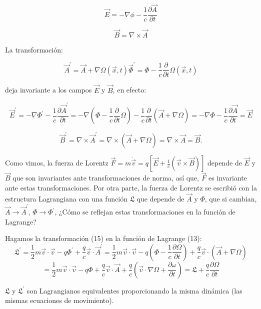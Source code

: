 \documentclass{article}
\begin{document}
\begin{equation*}
\vec{E} = -\nabla \phi - \frac{1}{c} \frac{\partial \vec{A}}{\partial t}
\end{equation*}

\begin{equation*}
\vec{B} = \nabla \times \vec{A}
\end{equation*}

La transformación:

\begin{equation}
\vec{A}^{'} = \vec{A} + \nabla \Omega (\vec{x},t)
\vec{\Phi}^{'} = \Phi - \frac{1}{c} \frac{\partial }{\partial t} \Omega(\vec{x},t)
\end{equation}

deja invariante a los campos $\vec{E}$ y $\vec{B}$, en efecto: 

\begin{equation*}
\vec{E}^{'} = -\nabla \Phi^{'} - \frac{1}{c} \frac{\partial \vec{A}^{'}}{\partial t} = - \nabla \left ( \Phi - \frac{1}{c} \frac{\partial }{\partial t} \Omega \right ) - \frac{1}{c} \frac{\partial }{\partial t} \left (  \vec{A} + \nabla \Omega \right ) = -\nabla\Phi - \frac{1}{c} \frac{\partial \vec{A}}{\partial t} = \vec{E}
\end{equation*}

\begin{equation*}
\vec{B}^{'} = \nabla \times \vec{A}^{'} = \nabla \times \left ( \vec{A} + \nabla \Omega \right ) = \nabla \times \vec{A} = \vec{B}.
\end{equation*}

Como vimos, la fuerza de Lorentz $\vec{F} = m\dot \vec{v} = q\left [ \vec{E} + \frac{1}{c} \left ( \vec{v} \times \vec{B} \right ) \right ]$ depende de $\vec{E}$ y $\vec{B}$ que son invariantes ante transformaciones de norma, así que, $\vec{F}$ es invariante ante estas transformaciones. Por otra parte, la fuerza de Lorentz se escribió con la estructura Lagrangiana con una función $\mathfrak{L}$ que depende de $\vec{A}$ y $\Phi$, que si cambian, $\vec{A} \rightarrow \vec{A}^{'}$, $\Phi \rightarrow \Phi^{'}$, ¿Cómo se reflejan estas transformaciones en la función de Lagrange?

Hagamos la transformación (15) en la función de Lagrange (13):
\begin{equation*}
\mathfrak{L}^{'}= \frac{1}{2} m\vec{v}\cdot\vec{v} - q\Phi^{'} + \frac{q}{c}
\vec{v}\cdot\vec{A}^{'} = \frac{1}{2} m\vec{v}\cdot\vec{v} -q \left ( \Phi - \frac{1}{c} \frac{\partial \Omega}{\partial t} \right ) + \frac{q}{c} \vec{v} \cdot \left ( \vec{A} + \nabla\Omega \right ) 
\end{equation*}
\begin{equation*}
= \frac{1}{2}  m\vec{v}\cdot\vec{v} - q\Phi + \frac{q}{c} \vec{v}\cdot\vec{A} + \frac{q}{c} \left ( \vec{v} \cdot \nabla\Omega + \frac{\partial \omega}{\partial t} \right ) = \mathfrak{L} + \frac{q}{c} \frac{\partial \Omega}{\partial t}
\end{equation*}

$\mathfrak{L}$ y $\mathfrak{L}^{'}$ son Lagrangianos equivalentes proporcionando la misma dinámica (las mismas ecuaciones de movimiento).
\end{document}
